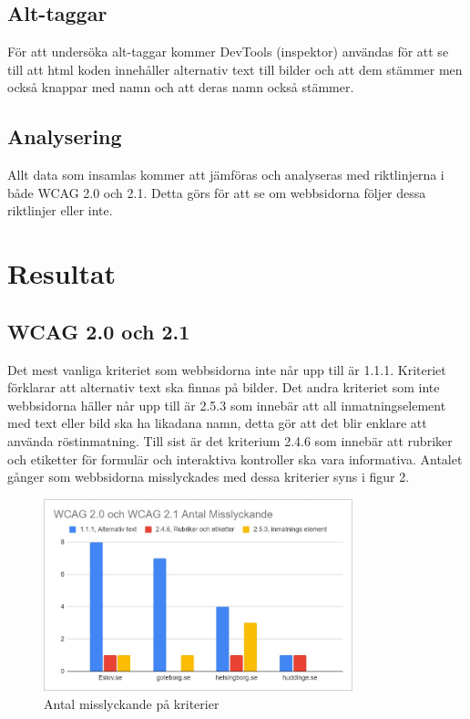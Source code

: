 \documentclass[11p]{article}
\begin{document}
    \subsection{Alt-taggar}
    För att undersöka alt-taggar kommer DevTools (inspektor) användas för att se till att html koden innehåller alternativ text till bilder och att dem stämmer men också knappar med namn och att deras namn också stämmer.

    \subsection{Analysering}

    Allt data som insamlas kommer att jämföras och analyseras med riktlinjerna i både WCAG 2.0 och 2.1.
    Detta görs för att se om webbsidorna följer dessa riktlinjer eller inte.

    \section{Resultat}
    
    \subsection{WCAG 2.0 och 2.1}
    Det mest vanliga kriteriet som webbsidorna inte når upp till är 1.1.1.
    Kriteriet förklarar att alternativ text ska finnas på bilder.
    Det andra kriteriet som inte webbsidorna häller når upp till är 2.5.3 som innebär att all inmatningselement med text eller bild ska ha likadana namn, detta gör att det blir enklare att använda röstinmatning.
    Till sist är det kriterium 2.4.6 som innebär att rubriker och etiketter för formulär och interaktiva kontroller ska vara informativa.
    Antalet gånger som webbsidorna misslyckades med dessa kriterier syns i figur 2.

    \begin{figure}[hbt!]
        \includegraphics[width=0.8\textwidth]{../images/antalmisslyckande.jpg}
        \caption{ Antal misslyckande på kriterier }
    \end{figure}
\end{document}
